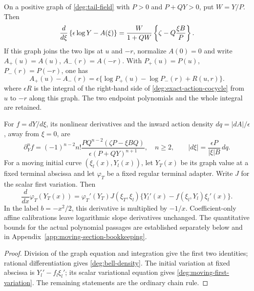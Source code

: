\begin{lemma}\label{deg:lem-moving-lip}
On a positive graph of \eqref{deg:tail-field} with
\(P>0\) and \(P+QY>0\), put \(W=Y/P\). Then
\begin{equation}
 {d\over d\xi}\left\{
  \epsilon\log Y-A(\xi)\right\}
 ={W\over1+QW}\left\{\zeta-Q{\xi B\over P}\right\}.
 \label{deg:exact-action-cocycle}
\end{equation}
If this graph joins the two lips at \(u\) and \(-r\), normalize
\(A(0)=0\) and write \(A_+(u)=A(u)\), \(A_-(r)=A(-r)\).
With \(P_+(u)=P(u)\), \(P_-(r)=P(-r)\), one has
\begin{equation}
 A_+(u)-A_-(r)
 =\epsilon\{\log P_+(u)-\log P_-(r)+R(u,r)\}.
 \label{deg:action-matching}
\end{equation}
where \(\epsilon R\) is the integral of the right-hand side of
\eqref{deg:exact-action-cocycle} from \(u\) to \(-r\) along this
graph. The two endpoint polynomials and the whole integral are retained.

For \(f=dY/d\xi\), its nonlinear derivatives and the inward
action density \(dq=|dA|/\epsilon\), away from \(\xi=0\), are
\begin{equation}
 \partial_Y^nf=(-1)^{n-2}n!
 \frac{PQ^{n-2}(\zeta P-\xi BQ)}{\epsilon(P+QY)^{n+1}},
 \quad n\ge2,\qquad
 |d\xi|=\frac{\epsilon P}{|\xi|B}\,dq.
 \label{deg:bell-density}
\end{equation}
For a moving initial curve \((\xi_l(x),Y_l(x))\), let
\(Y_T(x)\) be its graph value at a fixed terminal abscissa and let
\(\varphi_T\) be a fixed regular terminal adapter. Write
\(J\) for the scalar first variation. Then
\begin{equation}
 \frac d{dx}\varphi_T(Y_T(x))
 =\varphi_T'(Y_T)J(\xi_T,\xi_l)
                 \{Y_l'(x)-f(\xi_l,Y_l)\xi_l'(x)\}.
 \label{deg:moving-first-variation}
\end{equation}
In the label \(b=-x^2/2\), this derivative is multiplied by
\(-1/x\). Coefficient-only affine calibrations leave logarithmic
slope derivatives unchanged. The quantitative bounds for the actual
polynomial passages are established separately below and in
Appendix~\ref{app:moving-section-bookkeeping}.
\end{lemma}

\begin{proof}
Division of the graph equation and integration give the first two
identities; rational differentiation gives \eqref{deg:bell-density}.
The initial variation at fixed abscissa is
\(Y_l'-f_l\xi_l'\); its scalar variational equation gives
\eqref{deg:moving-first-variation}. The remaining statements are
the ordinary chain rule.
\end{proof}


